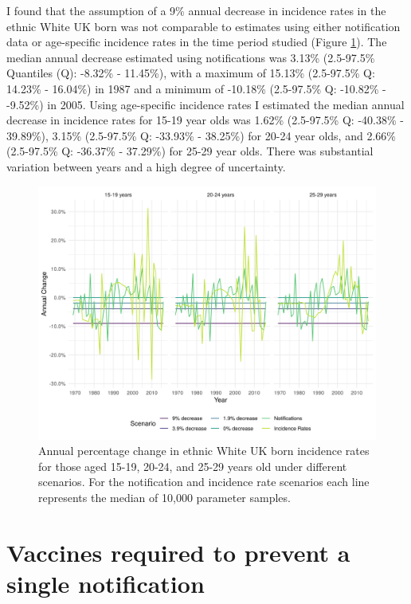 \documentclass[11pt,twoside]{bristolthesis}
\begin{document}
  I found that the assumption of a 9\% annual decrease in incidence rates in the ethnic White UK born was not comparable to estimates using either notification data or age-specific incidence rates in the time period studied (Figure \ref{fig:plot-annual-change}). The median annual decrease estimated using notifications was 3.13\% (2.5-97.5\% Quantiles (Q): -8.32\% - 11.45\%), with a maximum of 15.13\% (2.5-97.5\% Q: 14.23\% - 16.04\%) in 1987 and a minimum of -10.18\% (2.5-97.5\% Q: -10.82\% - -9.52\%) in 2005. Using age-specific incidence rates I estimated the median annual decrease in incidence rates for 15-19 year olds was 1.62\% (2.5-97.5\% Q: -40.38\% - 39.89\%), 3.15\% (2.5-97.5\% Q: -33.93\% - 38.25\%) for 20-24 year olds, and 2.66\% (2.5-97.5\% Q: -36.37\% - 37.29\%) for 25-29 year olds. There was substantial variation between years and a high degree of uncertainty.
  \begin{figure}
  
  {\centering \includegraphics[width=0.8\linewidth,]{chapters/evidence-policy-change/plot-annual-change-1} 
  
  }
  
  \caption[Annual percentage change in ethnic White UK born incidence rates for those aged 15-19, 20-24, and 25-29 years old under different scenarios.]{Annual percentage change in ethnic White UK born incidence rates for those aged 15-19, 20-24, and 25-29 years old under different scenarios. For the notification and incidence rate scenarios each line represents the median of 10,000 parameter samples.}\label{fig:plot-annual-change}
  \end{figure}
  \hypertarget{vaccines-required-to-prevent-a-single-notification}{%
  \section{Vaccines required to prevent a single notification}\label{vaccines-required-to-prevent-a-single-notification}}
  
\end{document}
